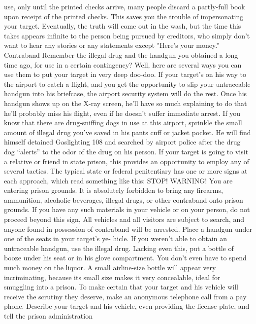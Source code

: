 \documentclass{book}
\begin{document}
use, only until the printed checks arrive, many people discard a 
partly-full book upon receipt of the printed checks. This saves 
you the trouble of impersonating your target. 
Eventually, the truth will come out in the wash, but the time 
this takes appears infinite to the person being pursued by 
creditors, who simply don't want to hear any stories or any 
statements except "Here's your money.” 
Contraband 
Remember the illegal drug and the handgun you obtained a 
long time ago, for use in a certain contingency? Well, here are 
several ways you can use them to put your target in very deep 
doo-doo. 
If your target's on his way to the airport to catch a flight, 
and you get the opportunity to slip your untraceable handgun 
into his briefcase, the airport security system will do the rest. 
Once his handgun shows up on the X-ray screen, he'll have so 
much explaining to do that he'll probably miss his flight, even if 
he doesn't suffer immediate arrest. 
If you know that there are drug-sniffing dogs in use at this 
airport, sprinkle the small amount of illegal drug you've saved 
in his pants cuff or jacket pocket. He will find himself detained  Gaslighting 
108 
and searched by airport police after the drug dog “alerts” to the 
odor of the drug on his person. 
If your target is going to visit a relative or friend in state 
prison, this provides an opportunity to employ any of several 
tactics. The typical state or federal penitentiary has one or more 
signs at each approach, which read something like this: 
STOP! 
WARNING! 
You are entering prison grounds. It is absolutely 
forbidden to bring any firearms, ammunition, alcoholic 
beverages, illegal drugs, or other contraband onto 
prison grounds. If you have any such materials in your 
vehicle or on your person, do not proceed beyond this 
sign, All vehicles and all visitors are subject to search, 
and anyone found in possession of contraband will be 
arrested. 
Place a handgun under one of the seats in your target's ye- 
hicle. If you weren't able to obtain an untraceable handgun, use 
the illegal drug. Lacking even this, put a bottle of booze under 
his seat or in his glove compartment. You don't even have to 
spend much money on the liquor. A small airline-size bottle 
will appear very incriminating, because its small size makes it 
very concealable, ideal for smuggling into a prison. 
To make certain that your target and his vehicle will receive 
the scrutiny they deserve, make an anonymous telephone call 
from a pay phone. Describe your target and his vehicle, even 
providing the license plate, and tell the prison administration 
\end{document}
